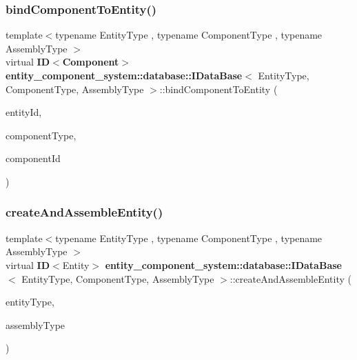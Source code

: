 \label{classentity__component__system_1_1database_1_1_i_data_base_a3fa3416dbb90294924923df7a67db356} 
\subsubsection{bind\+Component\+To\+Entity()}
{\footnotesize\ttfamily template$<$typename Entity\+Type , typename Component\+Type , typename Assembly\+Type $>$ \\
virtual {\bf ID}$<${\bf Component}$>$ {\bf entity\+\_\+component\+\_\+system\+::database\+::\+I\+Data\+Base}$<$ Entity\+Type, Component\+Type, Assembly\+Type $>$\+::bind\+Component\+To\+Entity (\begin{DoxyParamCaption}\item[{{\bf ID}$<$ Entity $>$ const \&}]{entity\+Id,  }\item[{Component\+Type const}]{component\+Type,  }\item[{{\bf ID}$<$ {\bf Component} $>$ const \&}]{component\+Id }\end{DoxyParamCaption})\hspace{0.3cm}{\ttfamily [pure virtual]}}

\label{classentity__component__system_1_1database_1_1_i_data_base_a41c7ed5f04ac166e142878e32ae5e3e5} 
\subsubsection{create\+And\+Assemble\+Entity()}
{\footnotesize\ttfamily template$<$typename Entity\+Type , typename Component\+Type , typename Assembly\+Type $>$ \\
virtual {\bf ID}$<$Entity$>$ {\bf entity\+\_\+component\+\_\+system\+::database\+::\+I\+Data\+Base}$<$ Entity\+Type, Component\+Type, Assembly\+Type $>$\+::create\+And\+Assemble\+Entity (\begin{DoxyParamCaption}\item[{Entity\+Type const}]{entity\+Type,  }\item[{Assembly\+Type const}]{assembly\+Type }\end{DoxyParamCaption})\hspace{0.3cm}{\ttfamily [pure virtual]}}

